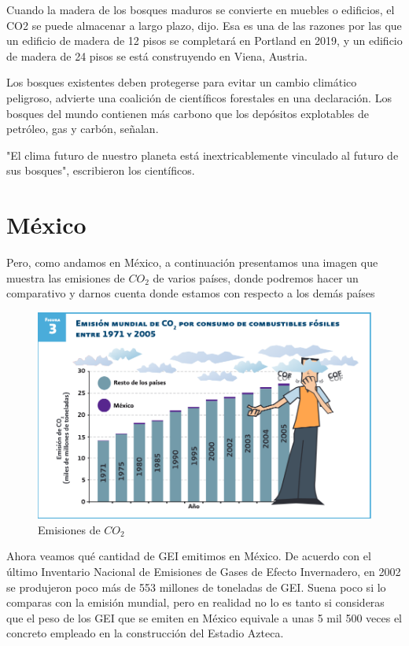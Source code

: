 \documentclass[12pt,a4paper]{article}
\begin{document}
\noindent Cuando la madera de los bosques maduros se convierte en muebles o edificios, el CO2 se puede almacenar a largo plazo, dijo. Esa es una de las razones por las que un edificio de madera de 12 pisos se completará en Portland en 2019, y un edificio de madera de 24 pisos se está construyendo en Viena, Austria.

\noindent Los bosques existentes deben protegerse para evitar un cambio climático peligroso, advierte una coalición de científicos forestales en una declaración. Los bosques del mundo contienen más carbono que los depósitos explotables de petróleo, gas y carbón, señalan.

\noindent "El clima futuro de nuestro planeta está inextricablemente vinculado al futuro de sus bosques", escribieron los científicos.


\section{México}

\noindent Pero, como andamos en México, a continuación presentamos una imagen que muestra las emisiones de $CO_2$ de varios países, donde podremos hacer un comparativo y darnos cuenta donde estamos con respecto a los demás países

\begin{figure}[H]
  \centering
   \includegraphics[scale=0.8]{grafica1.PNG}
  \caption{Emisiones de $CO_2$}
  \label{fig:ejemplo}
\end{figure} 

\noindent Ahora  veamos  qué  cantidad  de  GEI  emitimos en  México.  De  acuerdo  con  el  último  Inventario Nacional   de   Emisiones   de   Gases   de   Efecto Invernadero,  en  2002  se  produjeron  poco  más de 553 millones de toneladas de GEI. Suena poco si lo comparas con la emisión mundial, pero en realidad no lo es tanto si consideras que el peso de los GEI que se emiten en México equivale a unas 5 mil 500 veces el concreto empleado en la  construcción  del  Estadio  Azteca. 
\end{document}

